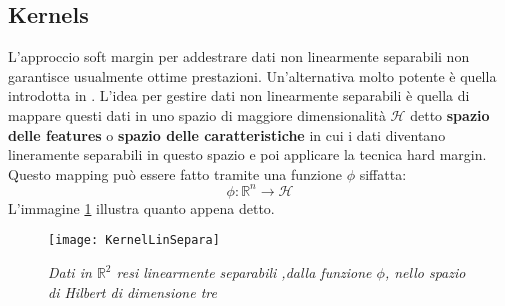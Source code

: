 \subsection{Kernels}
\label{sub:kernels}
L'approccio soft margin per addestrare dati non linearmente separabili non garantisce usualmente ottime prestazioni. Un'alternativa molto potente è quella introdotta in \cite{Vapnik92}. L'idea per gestire dati non linearmente separabili è quella di mappare questi dati in uno spazio di maggiore dimensionalità $\mathcal{H}$ detto \textbf{spazio delle features} o \textbf{spazio delle caratteristiche} in cui i dati diventano lineramente separabili in questo spazio e poi applicare la tecnica hard margin. Questo mapping può essere fatto tramite una funzione $\phi$ siffatta:
\begin{equation*}
\phi : \mathbb{R}^n \to \mathcal{H}
\end{equation*}
L'immagine \ref{fig:kls} illustra quanto appena detto. 

\begin{figure}[htp]
	\centering
	\texttt{[image: KernelLinSepara]}
	\caption[Mapping in feature space]{\textit{Dati in $\mathbb{R}^{2}$ resi linearmente separabili ,dalla funzione $\phi$, nello spazio di Hilbert di dimensione tre}}
   \label{fig:kls}
\end{figure}

